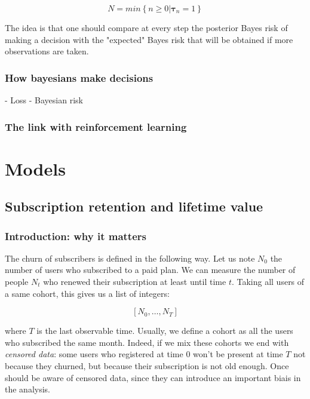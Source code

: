 \documentclass{tufte-book}
\begin{document}
\begin{equation}
  N = min\left\{n\geq0 | \mathbf{\tau}_n = 1\right\}
\end{equation}

The idea is that one should compare at every step the posterior Bayes risk of making a decision with the
"expected" Bayes risk that will be obtained if more observations are taken.



    \subsection{How bayesians make decisions}%
    \label{sub:how_bayesians_make_decisions}

- Loss
- Bayesian risk

    \subsection{The link with reinforcement learning}%
    \label{sub:the_link_with_reinforcement_learning}



\chapter{Models}
\label{chap:models}
  
  \section{Subscription retention and lifetime value}%
  \label{sec:churn_of_subscription_and_lifetime_value}


    \subsection{Introduction: why it matters}%
    \label{sub:introduction_why_it_matters}
  
  
The churn of subscribers is defined in the following way. Let us note $N_0$ the number of users who subscribed
to a paid plan. We can measure the number of people $N_t$ who renewed their subscription at least until time
$t$. Taking all users of a same cohort, this gives us a list of integers:

\begin{equation}
  \left[N_0, \dots, N_T \right]
\end{equation}

where $T$ is the last observable time. Usually, we define a cohort as all the users who subscribed the same
month. Indeed, if we mix these cohorts we end with \textit{censored data}: some users who registered at time $0$
won't be present at time $T$ not because they churned, but because their subscription is not old enough. Once
should be aware of censored data, since they can introduce an important biais in the analysis.
\end{document}
